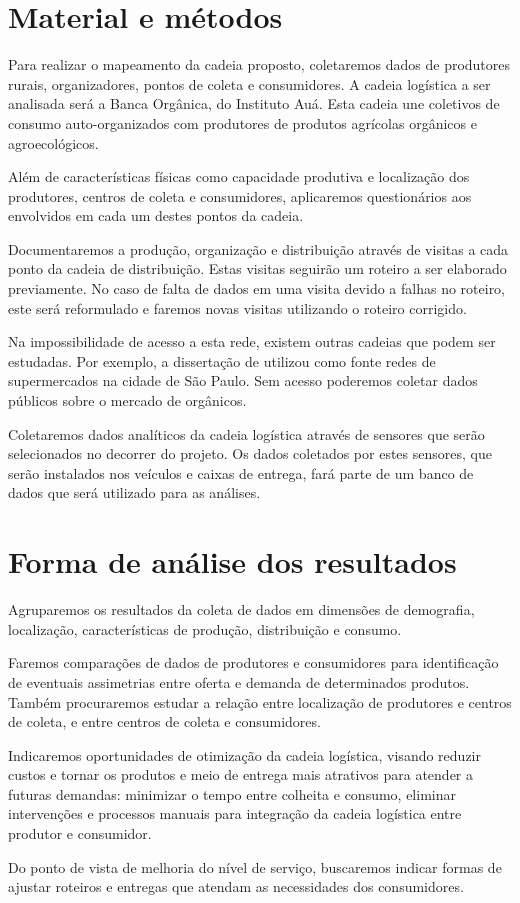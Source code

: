 \documentclass[
	12pt,				%
	openright,			%
	oneside,			%
	a4paper,			%
	english,			%
	french,				%
	spanish,			%
	brazil,				%
	]{abntex2}
\begin{document}
\chapter{Material e métodos}

Para realizar o mapeamento da cadeia proposto, coletaremos dados de produtores rurais, organizadores, pontos de coleta e consumidores. A cadeia logística a ser analisada será a Banca Orgânica, do Instituto Auá. Esta cadeia une coletivos de consumo auto-organizados com produtores de produtos agrícolas orgânicos e agroecológicos.

Além de características físicas como capacidade produtiva e  localização dos produtores, centros de coleta e consumidores, aplicaremos questionários aos envolvidos em cada um destes pontos da cadeia.

Documentaremos a produção, organização e distribuição através de visitas a cada ponto da cadeia de distribuição. Estas visitas seguirão um roteiro a ser elaborado previamente. No caso de falta de dados em uma visita devido a falhas no roteiro, este será reformulado e faremos novas visitas utilizando o roteiro corrigido.

Na impossibilidade de acesso a esta rede, existem outras cadeias que podem ser estudadas. Por exemplo, a dissertação de  utilizou como fonte redes de supermercados na cidade de São Paulo. Sem acesso poderemos coletar dados públicos sobre o mercado de orgânicos.

Coletaremos dados analíticos da cadeia logística através de sensores que serão selecionados no decorrer do projeto. Os dados coletados por estes sensores, que serão instalados nos veículos e caixas de entrega, fará parte de um banco de dados que será utilizado para as análises.

\chapter{Forma de análise dos resultados}

Agruparemos os resultados da coleta de dados em dimensões de demografia, localização, características de produção, distribuição e consumo.

Faremos comparações de dados de produtores e consumidores para identificação de eventuais assimetrias entre oferta e demanda de determinados produtos. Também procuraremos estudar a relação entre localização de produtores e centros de coleta, e entre centros de coleta e consumidores.

Indicaremos oportunidades de otimização da cadeia logística, visando reduzir custos e tornar os produtos e meio de entrega mais atrativos para atender a futuras demandas: minimizar o tempo entre colheita e consumo, eliminar intervenções e processos manuais para integração da cadeia logística entre produtor e consumidor.

Do ponto de vista de melhoria do nível de serviço, buscaremos indicar formas de ajustar roteiros e entregas que atendam as necessidades dos consumidores.


\end{document}
